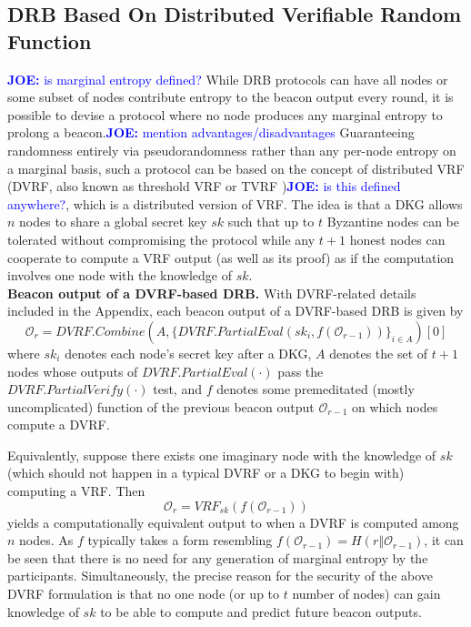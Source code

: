 \documentclass[letterpaper,twocolumn,10pt]{article}
\theoremstyle{definition}
\theoremstyle{remark}
\newcommand{\joenote}[1]{\textcolor{blue}{\textbf{JOE:} #1}}
\begin{document}
\subsection{DRB Based On Distributed Verifiable Random Function}
\joenote{is marginal entropy defined?}
While DRB protocols can have all nodes or some subset of nodes contribute entropy to the beacon output every round, it is possible to devise a protocol where no node produces any marginal entropy to prolong a beacon.\joenote{mention advantages/disadvantages} Guaranteeing randomness entirely via pseudorandomness rather than any per-node entropy on a marginal basis, such a protocol can be based on the concept of distributed VRF \cite{hanke2018dfinity,galindo2020fully} (DVRF, also known as threshold VRF or TVRF \cite{cascudomt})\joenote{is this defined anywhere?}, which is a distributed version of VRF. The idea is that a DKG allows $n$ nodes to share a global secret key $sk$ such that up to $t$ Byzantine nodes can be tolerated without compromising the protocol while any $t + 1$ honest nodes can cooperate to compute a VRF output (as well as its proof) as if the computation involves one node with the knowledge of $sk$.\\

\noindent\textbf{Beacon output of a DVRF-based DRB.} With DVRF-related details included in the Appendix, each beacon output of a DVRF-based DRB is given by
\begingroup\makeatletter\def\f@size{8}\check@mathfonts
\[
\mathcal{O}_r = DVRF.Combine(A, \{DVRF.PartialEval(sk_i, f(\mathcal{O}_{r - 1}))\}_{i \in A})[0]
\]\endgroup
where $sk_i$ denotes each node's secret key after a DKG, $A$ denotes the set of $t + 1$ nodes whose outputs of $DVRF.PartialEval(\cdot)$ pass the $DVRF.PartialVerify(\cdot)$ test, and $f$ denotes some premeditated (mostly uncomplicated) function of the previous beacon output $\mathcal{O}_{r - 1}$ on which nodes compute a DVRF.

Equivalently, suppose there exists one imaginary node with the knowledge of $sk$ (which should not happen in a typical DVRF or a DKG to begin with) computing a VRF. Then
\[
\mathcal{O}_r = VRF_{sk}(f(\mathcal{O}_{r - 1}))
\]
yields a computationally equivalent output to when a DVRF is computed among $n$ nodes. As $f$ typically takes a form resembling $f(\mathcal{O}_{r - 1}) = H(r \mathbin\Vert \mathcal{O}_{r - 1})$, it can be seen that there is no need for any generation of marginal entropy by the participants. Simultaneously, the precise reason for the security of the above DVRF formulation is that no one node (or up to $t$ number of nodes) can gain knowledge of $sk$ to be able to compute and predict future beacon outputs.\\
\end{document}
